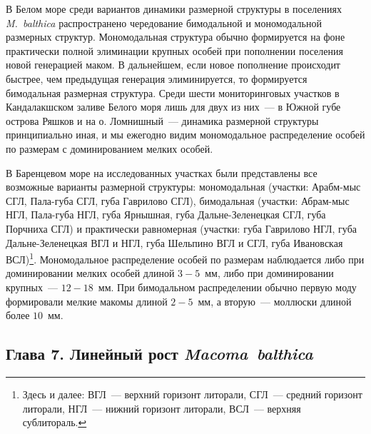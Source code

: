 {В Белом море среди вариантов динамики размерной структуры в поселениях {\it M.~balthica} распространено чередование бимодальной и мономодальной размерных структур.
Мономодальная структура обычно формируется на фоне практически полной элиминации крупных особей при пополнении поселения новой генерацией маком.
В дальнейшем, если новое пополнение происходит быстрее, чем предыдущая генерация элиминируется, то формируется бимодальная размерная структура.
Среди шести мониторинговых участков в Кандалакшском заливе Белого моря лишь для двух из них~--- в Южной губе острова Ряшков и на о. Ломнишный~--- динамика размерной структуры принципиально иная, и мы ежегодно видим мономодальное распределение особей по размерам с доминированием мелких особей.

В Баренцевом море на исследованных участках были представлены все возможные варианты размерной структуры: мономодальная (участки: Арабм-мыс СГЛ, Пала-губа СГЛ, губа Гаврилово СГЛ), бимодальная (участки: Абрам-мыс НГЛ, Пала-губа НГЛ, губа Ярнышная, губа Дальне-Зеленецкая СГЛ, губа Порчниха СГЛ) и практически равномерная (участки: губа Гаврилово НГЛ, губа Дальне-Зеленецкая ВГЛ и НГЛ, губа Шельпино ВГЛ и СГЛ, губа Ивановская ВСЛ)\footnote{Здесь и далее: ВГЛ~--- верхний горизонт литорали, СГЛ~--- средний горизонт литорали, НГЛ~--- нижний горизонт литорали, ВСЛ~--- верхняя сублитораль.}. 
Мономодальное распределение особей по размерам наблюдается либо при доминировании мелких особей длиной $3-5$~мм, либо при доминировании крупных~--- $12-18$~мм.
При бимодальном распределении обычно первую моду формировали мелкие макомы длиной $2-5$~мм, а вторую~--- моллюски длиной более $10$~мм.



\subsection*{Глава 7. Линейный рост \textit{Macoma~balthica}}

}
